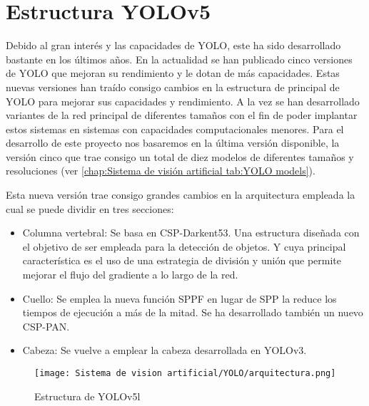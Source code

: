 \chapter{Estructura YOLOv5}
\label{apex:Estructura YOLOv5}
Debido al gran interés y las capacidades de YOLO, este ha sido desarrollado bastante en los últimos años. En la actualidad se han publicado cinco versiones de YOLO que mejoran su rendimiento y le dotan de más capacidades. Estas nuevas versiones han traído consigo cambios en la estructura de principal de YOLO para mejorar sus capacidades y rendimiento. A la vez se han desarrollado variantes de la red principal de diferentes tamaños con el fin de poder implantar estos sistemas en sistemas con capacidades computacionales menores. Para el desarrollo de este proyecto nos basaremos en la última versión disponible, la versión cinco que trae consigo un total de diez modelos de diferentes tamaños y resoluciones (ver \autoref{chap:Sistema de visión artificial tab:YOLO models}).

Esta nueva versión trae consigo grandes cambios en la arquitectura empleada la cual se puede dividir en tres secciones:
\begin{itemize}
\item Columna vertebral: Se basa en CSP-Darkent53. Una estructura diseñada con el objetivo de ser empleada para la detección de objetos. Y cuya principal característica es el uso de una estrategia de división y unión que permite mejorar el flujo del gradiente a lo largo de la red.
\item Cuello: Se emplea la nueva función SPPF en lugar de SPP la reduce los tiempos de ejecución a más de la mitad. Se ha desarrollado también un nuevo CSP-PAN.
\item Cabeza: Se vuelve a emplear la cabeza desarrollada en YOLOv3.
\end{itemize}

\begin{figure}[p]
	\centering
	\texttt{[image: Sistema de vision artificial/YOLO/arquitectura.png]}
	\caption{Estructura de YOLOv5l}
	\label{chap:Sistema de visión artificial fig:Arquitectura YOLO}
\end{figure}